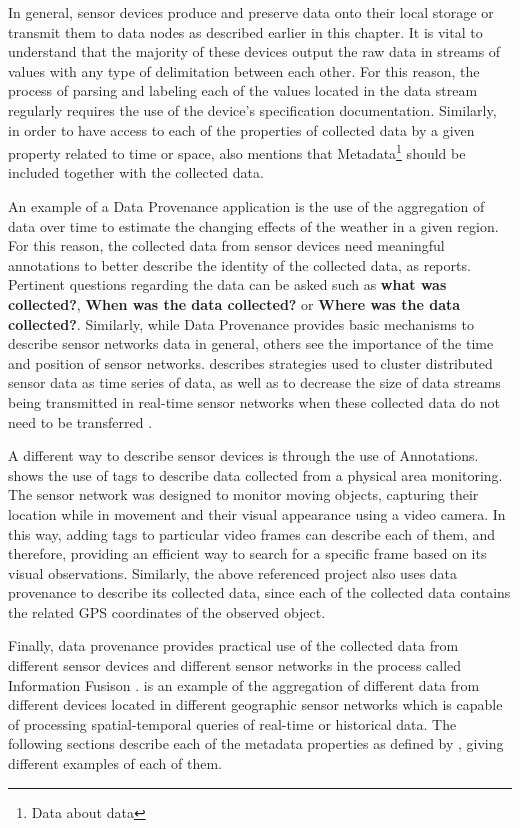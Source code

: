 In general, sensor devices produce and preserve data onto their local
storage or transmit them to data nodes as described earlier in this chapter. It
is vital to understand that the majority of these devices output the raw data
in streams of values with any type of delimitation between each other. For
this reason, the process of parsing and labeling each of the values located
in the data stream regularly requires the use of the device's specification
documentation. Similarly, in order to have access to each of the properties of
collected data by a given property related to time or space,
\cite{sn-provenance} also mentions that Metadata\footnote{Data about data}
should be included together with the collected data.

An example of a Data Provenance application is the use of the aggregation of data
over time to estimate the changing effects of the weather in a given region.
For this reason, the collected data from sensor devices need meaningful
annotations to better describe the identity of the collected data, as 
\cite{sn-provenance} reports. Pertinent questions regarding the
data can be asked such as \textbf{what was collected?}, \textbf{When was the
data collected?} or \textbf{Where was the data collected?}. Similarly, while
Data Provenance provides basic mechanisms to describe sensor networks data in
general, others see the importance of the time and position of sensor networks.
\cite{sn-time-series} describes strategies used to cluster distributed sensor
data as time series of data, as well as to decrease the size of data streams
being transmitted in real-time sensor networks when these collected data do
not need to be transferred \cite{sn-data-reduction}.

A different way to describe sensor devices is through the use of
Annotations. \cite{sn-annotation} shows the use of tags to describe data
collected from a physical area monitoring. The sensor network was
designed to monitor moving objects, capturing their location while in
movement and their visual appearance using a video camera. In this way,
adding tags to particular video frames can describe each of them, and
therefore, providing an efficient way to search for a specific frame based on
its visual observations. Similarly, the above referenced project also uses data
provenance to describe its collected data, since each of the collected data 
contains the related GPS coordinates of the observed object.

Finally, data provenance provides practical use of the collected data from
different sensor devices and different sensor networks in the process called
Information Fusison \cite{sn-info-fusion}. \cite{sn-geo-metadata} is an example of
the aggregation of different data from different devices located in different 
geographic sensor networks which is capable of processing spatial-temporal 
queries of real-time or historical data. The following sections describe each 
of the metadata properties as defined by \cite{sn-provenance}, giving different
examples of each of them.

